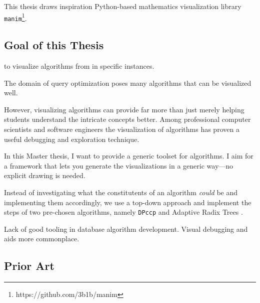 This thesis draws inspiration Python-based mathematics visualization library \texttt{manim}\footnote{https://github.com/3b1b/manim}.

\subsection{Goal of this Thesis}
to visualize algorithms from in specific instances.

The domain of query optimization poses many algorithms that can be visualized well.

However, visualizing algorithms can provide far more than just merely helping students understand the intricate concepts better.
Among professional computer scientists and software engineers the visualization of algorithms has proven a useful debugging and exploration technique.

In this Master thesis, I want to provide a generic toolset for algorithms. I aim for a framework that lets you generate the visualizations in a generic way—no explicit drawing is needed.

Instead of investigating what the constitutents of an algorithm \textit{could} be and
implementing them accordingly, we use a top-down approach and implement the steps of
two pre-chosen algorithms, namely \texttt{DPccp} \cite{moerkotte2006analysis} and Adaptive Radix Trees \cite{leis2013adaptive}.

Lack of good tooling in database algorithm development.
Visual debugging and aids more commonplace.

\subsection{Prior Art}
